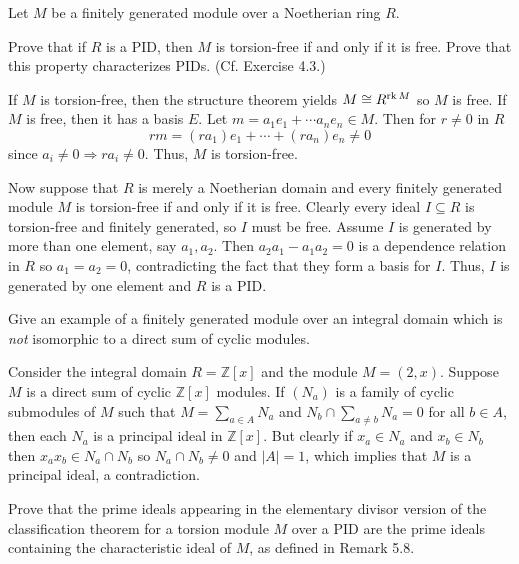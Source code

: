 \documentclass[../../master.tex]{subfiles}
\begin{document}
\begin{problem}
    Let $M$ be a finitely generated module over a Noetherian ring $R$.

    Prove that if $R$ is a PID, then $M$ is torsion-free if and only if it is free.
    Prove that this property characterizes PIDs. 
    (Cf. Exercise 4.3.)
\end{problem}

\begin{solution}
    If $M$ is torsion-free, then the structure theorem yields $M \cong R^{\operatorname{rk} M}$ so $M$ is free.
    If $M$ is free, then it has a basis $E$.
    Let $m = a_1 e_1 + \cdots a_n e_n \in M$.
    Then for $r \neq 0$ in $R$
    \[
        rm = (ra_1) e_1 + \cdots + (ra_n) e_n \neq 0
    \]
    since $a_i \neq 0 \Rightarrow ra_i \neq 0$.
    Thus, $M$ is torsion-free.
    
    Now suppose that $R$ is merely a Noetherian domain and every finitely generated module $M$ is torsion-free if and only if it is free.
    Clearly every ideal $I \subseteq R$ is torsion-free and finitely generated, so $I$ must be free.
    Assume $I$ is generated by more than one element, say $a_1, a_2$.
    Then $a_2 a_1 - a_1 a_2 = 0$ is a dependence relation in $R$ so $a_1 = a_2 = 0$, contradicting the fact that they form a basis for $I$.
    Thus, $I$ is generated by one element and $R$ is a PID.
\end{solution}

\begin{problem}
    Give an example of a finitely generated module over an integral domain which is \textit{not} isomorphic to a direct sum of cyclic modules.
\end{problem}

\begin{solution}
    Consider the integral domain $R = \mathbb{Z}[x]$ and the module $M = (2, x)$.
    Suppose $M$ is a direct sum of cyclic $\mathbb{Z}[x]$ modules.
    If $(N_{a})$ is a family of cyclic submodules of $M$ such that $M = \sum_{a \in A} N_a$ and $N_b \cap \sum_{a \neq b} N_a = 0$ for all $b \in A$, then each $N_a$ is a principal ideal in $\mathbb{Z}[x]$.
    But clearly if $x_a \in N_a$ and $x_b \in N_b$ then $x_a x_b \in N_a \cap N_b$ so $N_a \cap N_b \neq 0$ and $|A| = 1$, which implies that $M$ is a principal ideal, a contradiction.
\end{solution}

\begin{problem}
    Prove that the prime ideals appearing in the elementary divisor version of the classification theorem for a torsion module $M$ over a PID are the prime ideals containing the characteristic ideal of $M$, as defined in Remark 5.8.
\end{problem}
\end{document}
